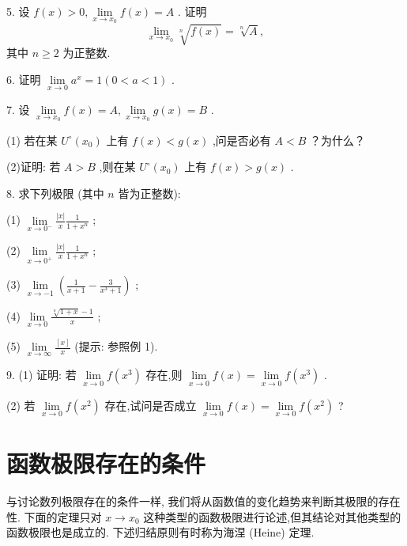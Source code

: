 5. 设 \(f\left( x\right)  > 0,\mathop{\lim }\limits_{{x \rightarrow  {x}_{0}}}f\left( x\right)  = A\) . 证明
\[
\mathop{\lim }\limits_{{x \rightarrow  {x}_{0}}}\sqrt[n]{f\left( x\right) } = \sqrt[n]{A},
\]
其中 \(n \geq  2\) 为正整数.



6. 证明 \(\mathop{\lim }\limits_{{x \rightarrow  0}}{a}^{x} = 1\left( {0 < a < 1}\right)\) .

7. 设 \(\mathop{\lim }\limits_{{x \rightarrow  {x}_{0}}}f\left( x\right)  = A,\mathop{\lim }\limits_{{x \rightarrow  {x}_{0}}}g\left( x\right)  = B\) .

(1) 若在某 \({U}^{ \circ  }\left( {x}_{0}\right)\) 上有 \(f\left( x\right)  < g\left( x\right)\) ,问是否必有 \(A < B\) ？为什么？

(2)证明: 若 \(A > B\) ,则在某 \({U}^{ \circ  }\left( {x}_{0}\right)\) 上有 \(f\left( x\right)  > g\left( x\right)\) .

8. 求下列极限 (其中 \(n\) 皆为正整数):

(1) \(\mathop{\lim }\limits_{{x \rightarrow  {0}^{ - }}}\frac{\left| x\right| }{x}\frac{1}{1 + {x}^{n}}\) ;

(2) \(\mathop{\lim }\limits_{{x \rightarrow  {0}^{ + }}}\frac{\left| x\right| }{x}\frac{1}{1 + {x}^{n}}\) ;

(3) \(\mathop{\lim }\limits_{{x \rightarrow   - 1}}\left( {\frac{1}{x + 1} - \frac{3}{{x}^{3} + 1}}\right)\) ;

(4) \(\mathop{\lim }\limits_{{x \rightarrow  0}}\frac{\sqrt[n]{1 + x} - 1}{x}\) ;

(5) \(\mathop{\lim }\limits_{{x \rightarrow  \infty }}\frac{\left\lbrack  x\right\rbrack  }{x}\) (提示: 参照例 1).

9. (1) 证明: 若 \(\mathop{\lim }\limits_{{x \rightarrow  0}}f\left( {x}^{3}\right)\) 存在,则 \(\mathop{\lim }\limits_{{x \rightarrow  0}}f\left( x\right)  = \mathop{\lim }\limits_{{x \rightarrow  0}}f\left( {x}^{3}\right)\) .

(2) 若 \(\mathop{\lim }\limits_{{x \rightarrow  0}}f\left( {x}^{2}\right)\) 存在,试问是否成立 \(\mathop{\lim }\limits_{{x \rightarrow  0}}f\left( x\right)  = \mathop{\lim }\limits_{{x \rightarrow  0}}f\left( {x}^{2}\right)\) ?

\section{函数极限存在的条件}

与讨论数列极限存在的条件一样, 我们将从函数值的变化趋势来判断其极限的存在性. 下面的定理只对 \(x \rightarrow  {x}_{0}\) 这种类型的函数极限进行论述,但其结论对其他类型的函数极限也是成立的. 下述归结原则有时称为海涅 (Heine) 定理.

